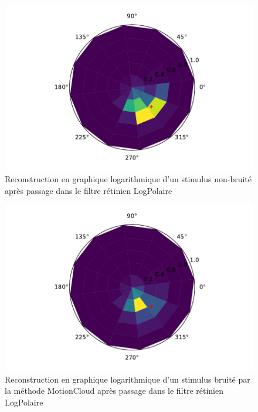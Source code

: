 \begin{figure}[th]
\centering
\includegraphics[scale=0.4]{Figures/mnist_log_nonoise}
\decoRule
\caption[Figure]{Reconstruction en graphique logarithmique d'un stimulus non-bruité après passage dans le filtre rétinien LogPolaire}
\label{fig:mnist_log_nonoise}
\end{figure}

\begin{figure}[th]
\centering
\includegraphics[scale=0.4]{Figures/mnist_log_motioncloud}
\decoRule
\caption[Figure]{Reconstruction en graphique logarithmique d'un stimulus bruité par la méthode MotionCloud après passage dans le filtre rétinien LogPolaire}
\label{fig:mnist_log_motioncloud}
\end{figure}

